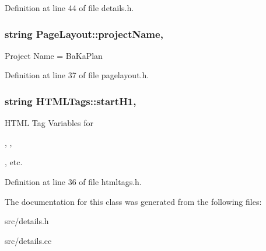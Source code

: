 Definition at line 44 of file details.\-h.

\hypertarget{classPageLayout_a8a3c1ddc422df2556fbc95d0cd575a05}{
\subsubsection[{project\-Name}]{\setlength{\rightskip}{0pt plus 5cm}string Page\-Layout\-::project\-Name\hspace{0.3cm}{\ttfamily [protected]}, {\ttfamily [inherited]}}}\label{classPageLayout_a8a3c1ddc422df2556fbc95d0cd575a05}
Project Name = Ba\-Ka\-Plan 

Definition at line 37 of file pagelayout.\-h.

\hypertarget{classHTMLTags_ae987289d0dab2e3e234048615f930d0f}{
\subsubsection[{start\-H1}]{\setlength{\rightskip}{0pt plus 5cm}string H\-T\-M\-L\-Tags\-::start\-H1\hspace{0.3cm}{\ttfamily [protected]}, {\ttfamily [inherited]}}}\label{classHTMLTags_ae987289d0dab2e3e234048615f930d0f}


H\-T\-M\-L Tag Variables for 

, , 

, etc. 



Definition at line 36 of file htmltags.\-h.



The documentation for this class was generated from the following files\-:\begin{DoxyCompactItemize}
\item 
src/details.\-h\item 
src/details.\-cc\end{DoxyCompactItemize}
